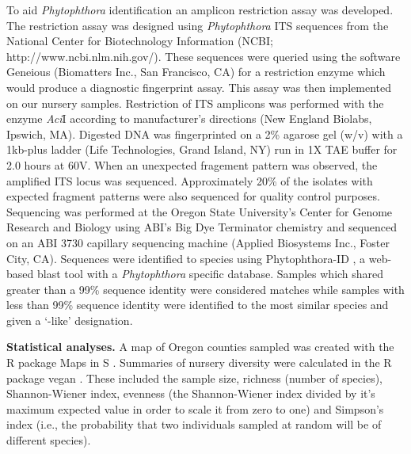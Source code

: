 \documentclass[12pt]{article}
\begin{document}
To aid \emph{Phytophthora} identification an amplicon restriction assay was developed.  The restriction assay was designed using \emph{Phytophthora} ITS sequences from the National Center for Biotechnology Information (NCBI; http://www.ncbi.nlm.nih.gov/).  These sequences were queried using the software Geneious (Biomatters Inc., San Francisco, CA) for a restriction enzyme which would produce a diagnostic fingerprint assay.  This assay was then implemented on our nursery samples.  Restriction of ITS amplicons was performed with the enzyme \emph{Aci}I according to manufacturer's directions (New England Biolabs, Ipswich, MA).  Digested DNA was fingerprinted on a 2\% agarose gel (w/v) with a 1kb-plus ladder (Life Technologies, Grand Island, NY) run in 1X TAE buffer for 2.0 hours at 60V.  When an unexpected fragement pattern was observed, the amplified ITS locus was sequenced.  Approximately 20\% of the isolates with expected fragment patterns were also sequenced for quality control purposes.  Sequencing was performed at the Oregon State University's Center for Genome Research and Biology using ABI's Big Dye Terminator chemistry and sequenced on an ABI 3730 capillary sequencing machine (Applied Biosystems Inc., Foster City, CA).  Sequences were identified to species using Phytophthora-ID \cite{grunwald_etal_2011}, a web-based blast \cite{altschul_etal_1990} tool with a \emph{Phytophthora} specific database.  Samples which shared greater than a 99\% sequence identity were considered matches while samples with less than 99\% sequence identity were identified to the most similar species and given a `-like' designation.


\textbf{Statistical analyses.} A map of Oregon counties sampled was created with the R package Maps in S \cite{R, r_maps}.  Summaries of nursery diversity were calculated in the R package vegan \cite{R, vegan}.  These included the sample size, richness (number of species), Shannon-Wiener index, evenness (the Shannon-Wiener index divided by it's maximum expected value in order to scale it from zero to one) and Simpson's index (i.e., the probability that two individuals sampled at random will be of different species).
\end{document}
